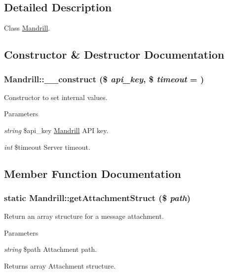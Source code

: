 \subsection{Detailed Description}
Class \hyperlink{classMandrill}{Mandrill}. 

\subsection{Constructor \& Destructor Documentation}
\hypertarget{classMandrill_a47e978ed08e12430e5d0f197fa71ad14}{
\subsubsection[{\_\-\_\-construct}]{\setlength{\rightskip}{0pt plus 5cm}Mandrill::\_\-\_\-construct (\$ {\em api\_\-key}, \/  \$ {\em timeout} = {})}}
\label{classMandrill_a47e978ed08e12430e5d0f197fa71ad14}
Constructor to set internal values.


\begin{DoxyParams}{Parameters}
\item[{\em string}]\$api\_\-key \hyperlink{classMandrill}{Mandrill} API key. \item[{\em int}]\$timeout Server timeout. \end{DoxyParams}


\subsection{Member Function Documentation}
\hypertarget{classMandrill_ae1d24c1776d5edb985752c5da0cc8e3a}{
\subsubsection[{getAttachmentStruct}]{\setlength{\rightskip}{0pt plus 5cm}static Mandrill::getAttachmentStruct (\$ {\em path})}}
\label{classMandrill_ae1d24c1776d5edb985752c5da0cc8e3a}
Return an array structure for a message attachment.


\begin{DoxyParams}{Parameters}
\item[{\em string}]\$path Attachment path.\end{DoxyParams}
\begin{DoxyReturn}{Returns}
array Attachment structure.
\end{DoxyReturn}

